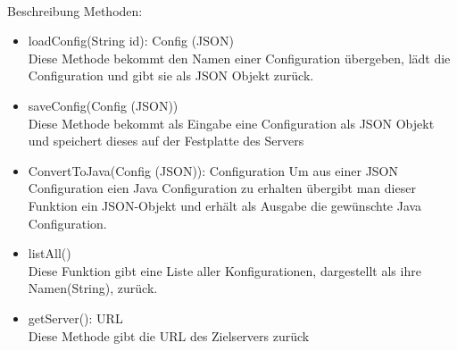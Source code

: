 \documentclass[a4paper, 12 pt, titlepage]{article}
\begin{document}
\ \\
Beschreibung Methoden:\\
\begin{itemize}
	\item loadConfig(String id): Config (JSON) \\
	Diese Methode bekommt den Namen einer Configuration übergeben, lädt die Configuration und gibt sie als JSON Objekt zurück.
	
	\item saveConfig(Config (JSON))\\
	Diese Methode bekommt als Eingabe eine Configuration als JSON Objekt
	und speichert dieses auf der Festplatte des Servers
	
	\item ConvertToJava(Config (JSON)): Configuration
	Um aus einer JSON Configuration eien Java Configuration zu erhalten übergibt man dieser Funktion ein JSON-Objekt und erhält als Ausgabe die gewünschte Java Configuration.
	
	\item listAll() \\
	Diese Funktion gibt eine Liste aller Konfigurationen, dargestellt als ihre Namen(String), zurück.
	
	\item getServer(): URL\\
	Diese Methode gibt die URL des Zielservers zurück 
\end{itemize}
\end{document}
